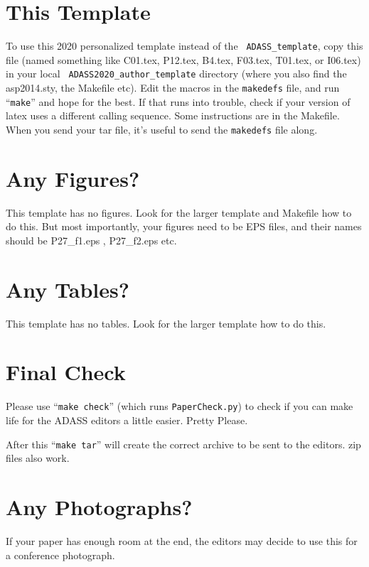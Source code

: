 \documentclass[11pt,twoside]{article}
\begin{document}
\section{This Template}

To use this 2020 personalized template instead of the {\tt
  ADASS\_template}, copy this file (named something like C01.tex,
P12.tex, B4.tex, F03.tex, T01.tex, or I06.tex) in your local {\tt
  ADASS2020\_author\_template} directory (where you also find the
asp2014.sty, the Makefile etc).  Edit the macros in the {\tt makedefs}
file, and run ``{\tt make}'' and hope for the best.  If that runs into
trouble, check if your version of latex uses a different calling
sequence.  Some instructions are in the Makefile. When you send your
tar file, it's useful to send the {\tt makedefs} file along.

\section{Any Figures?}

This template has no figures. Look for the larger template and
Makefile how to do this. But most importantly, your figures need to
be EPS files, and their names should be P27\_f1.eps ,
P27\_f2.eps  etc.

\section{Any Tables?}

This template has no tables. Look for the larger template
how to do this. 

\section{Final Check}

Please use ``{\tt make check}'' (which runs {\tt PaperCheck.py}) to
check if you can make life for the ADASS editors a little
easier. Pretty Please.

After this ``{\tt make tar}'' will create the correct archive to be sent to
the editors. zip files also work.

\section{Any Photographs?}

If your paper has enough room at the end, the editors may decide to use this
for a conference photograph.
\end{document}

